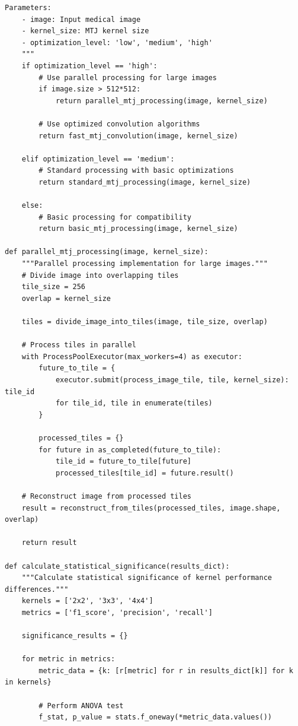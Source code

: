 \documentclass[conference]{IEEEtran}
\begin{document}
{{{{\begin{lstlisting}[caption={Performance optimization implementation}]
    Parameters:
    - image: Input medical image
    - kernel_size: MTJ kernel size
    - optimization_level: 'low', 'medium', 'high'
    """
    if optimization_level == 'high':
        # Use parallel processing for large images
        if image.size > 512*512:
            return parallel_mtj_processing(image, kernel_size)
        
        # Use optimized convolution algorithms
        return fast_mtj_convolution(image, kernel_size)
    
    elif optimization_level == 'medium':
        # Standard processing with basic optimizations
        return standard_mtj_processing(image, kernel_size)
    
    else:
        # Basic processing for compatibility
        return basic_mtj_processing(image, kernel_size)

def parallel_mtj_processing(image, kernel_size):
    """Parallel processing implementation for large images."""
    # Divide image into overlapping tiles
    tile_size = 256
    overlap = kernel_size
    
    tiles = divide_image_into_tiles(image, tile_size, overlap)
    
    # Process tiles in parallel
    with ProcessPoolExecutor(max_workers=4) as executor:
        future_to_tile = {
            executor.submit(process_image_tile, tile, kernel_size): tile_id 
            for tile_id, tile in enumerate(tiles)
        }
        
        processed_tiles = {}
        for future in as_completed(future_to_tile):
            tile_id = future_to_tile[future]
            processed_tiles[tile_id] = future.result()
    
    # Reconstruct image from processed tiles
    result = reconstruct_from_tiles(processed_tiles, image.shape, overlap)
    
    return result

def calculate_statistical_significance(results_dict):
    """Calculate statistical significance of kernel performance differences."""
    kernels = ['2x2', '3x3', '4x4']
    metrics = ['f1_score', 'precision', 'recall']
    
    significance_results = {}
    
    for metric in metrics:
        metric_data = {k: [r[metric] for r in results_dict[k]] for k in kernels}
        
        # Perform ANOVA test
        f_stat, p_value = stats.f_oneway(*metric_data.values())
        

\end{lstlisting}}}}}
\end{document}
